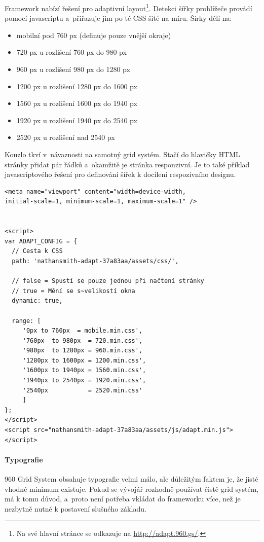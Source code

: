 \documentclass[thesis=B,czech]{FITthesis}[2012/06/26]
\begin{document}
Framework nabízí řešení pro adaptivní layout\footnote{Na své hlavní stránce se odkazuje na \url{http://adapt.960.gs/}.}. Detekci šířky prohlížeče provádí pomocí javascriptu a~přiřazuje jim po té CSS šité na míru. Šírky dělí na:

\begin{itemize}
 \item mobilní pod 760 px
(definuje pouze vnější okraje)
 \item 720 px u rozlišení 760 px do 980 px
 \item 960 px u rozlišení 980 px do 1280 px
 \item 1200 px u rozlišení 1280 px do 1600 px
 \item 1560 px u rozlišení 1600 px do 1940 px
 \item 1920 px u rozlišení 1940 px do 2540 px
 \item 2520 px u rozlišení nad 2540 px 
\end{itemize}

Kouzlo tkví v~návaznosti na samotný grid  systém. Stačí do hlavičky HTML stránky přidat pár řádků a~okamžitě je stránka responzivní. Je to také příklad javascriptového řešení pro definování šířek k docílení respozivního designu.
\scriptsize
\begin{verbatim}
<meta name="viewport" content="width=device-width, 
initial-scale=1, minimum-scale=1, maximum-scale=1" />


<script>
var ADAPT_CONFIG = {
  // Cesta k CSS
  path: 'nathansmith-adapt-37a83aa/assets/css/',
  
  // false = Spustí se pouze jednou při načtení stránky
  // true = Mění se s~velikostí okna
  dynamic: true,
  
  range: [
     '0px to 760px  = mobile.min.css',
     '760px  to 980px  = 720.min.css',
     '980px  to 1280px = 960.min.css',
     '1280px to 1600px = 1200.min.css',
     '1600px to 1940px = 1560.min.css',
     '1940px to 2540px = 1920.min.css',
     '2540px           = 2520.min.css'
     ]
};
</script>
<script src="nathansmith-adapt-37a83aa/assets/js/adapt.min.js"></script>
\end{verbatim}
\normalsize


\paragraph{Typografie}

960 Grid System obsahuje typografie velmi málo, ale důležitým faktem je, že jisté vhodné minimum existuje. Pokud se vývojář rozhodně používat čistě grid  systém, má k tomu důvod, a~proto není potřeba vkládat do frameworku více, než je nezbytně nutné k postavení slušného základu.
\end{document}
